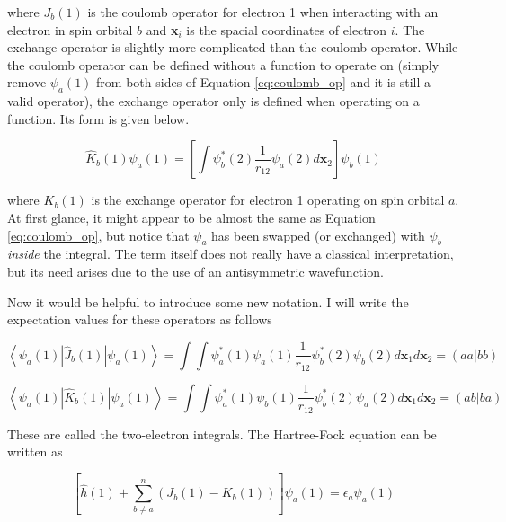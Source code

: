 where $J_{b}(1)$ is the coulomb operator for electron 1 when interacting with an electron in spin orbital $b$ and \textbf{x}$_{i}$ is the spacial coordinates of electron $i$. The exchange operator is slightly more complicated than the coulomb operator. While the coulomb operator can be defined without a function to operate on (simply remove $\psi_{a}(1)$ from both sides of Equation \ref{eq:coulomb_op} and it is still a valid operator), the exchange operator only is defined when operating on a function. Its form is given below.

\begin{equation}
\label{eq:exchange_op}
\hat{K}_{b}(1)\psi_{a}(1)=\left[\int\psi^{*}_{b}(2)\frac{1}{r_{12}}\psi_{a}(2)d\textbf{x}_{2}\right]\psi_{b}(1)
\end{equation} 

where $K_{b}(1)$ is the exchange operator for electron 1 operating on spin orbital $a$. At first glance, it might appear to be almost the same as Equation \ref{eq:coulomb_op}, but notice that $\psi_{a}$ has been swapped (or exchanged) with $\psi_{b}$ \textit{inside} the integral. The term itself does not really have a classical interpretation, but its need arises due to the use of an antisymmetric wavefunction.

Now it would be helpful to introduce some new notation. I will write the expectation values for these operators as follows

\begin{equation}
\label{eq:coulomb_op_ex}
\left<\psi_{a}(1)|\hat{J}_{b}(1)|\psi_{a}(1)\right>=\int\int\psi^{*}_{a}(1)\psi_{a}(1)\frac{1}{r_{12}}\psi^{*}_{b}(2)\psi_{b}(2)d\textbf{x}_{1}d\textbf{x}_{2}
=\left(aa|bb\right)
\end{equation} 

\begin{equation}
\label{eq:exchange_op_ex}
\left<\psi_{a}(1)|\hat{K}_{b}(1)|\psi_{a}(1)\right>=\int\int\psi^{*}_{a}(1)\psi_{b}(1)\frac{1}{r_{12}}\psi^{*}_{b}(2)\psi_{a}(2)d\textbf{x}_{1}d\textbf{x}_{2}
=\left(ab|ba\right)
\end{equation}

These are called the two-electron integrals. The Hartree-Fock equation can be written as 

 \begin{equation}
\label{eq:hartree-fock_eq}
\left[\hat{h}(1) + \sum^{n}_{b\neq a}\left(J_{b}(1)- K_{b}(1)\right)\right]\psi_{a}(1) = \epsilon_{a}\psi_{a}(1)
\end{equation}

